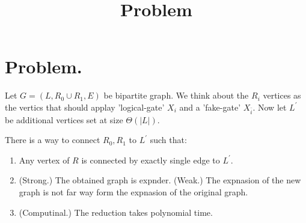 \documentclass[manuscript,screen,review]{acmart}
\begin{document}


\title{Problem} 

\ifdefined\ACM
\else
  \maketitle
\fi
%
\ifdefined\ACM
  \maketitle
\fi


\section{Problem.}

Let $G=(L, R_{0}\cup R_{1}, E)$ be bipartite graph. We think about the $R_{i}$ vertices as the vertics that should applay 'logical-gate' $X_{i}$ and a 'fake-gate' $X_{\bar{i}}$. Now let $L^{\prime}$ be additional vertices set at size $\Theta\left( |L| \right)$. 

\begin{claim}
  There is a way to connect $R_{0},R_{1}$ to $L^{\prime}$ such that: 
  \begin{enumerate}
    \item Any vertex of $R$ is connected by exactly single edge to $L^{\prime}$. 
    \item (Strong.) The obtained graph is expnder. (Weak.) The expnasion of the new graph is not far way form the expnasion of the original graph.
    \item (Computinal.) The reduction takes polynomial time.   
  \end{enumerate}
\end{claim}


\printbibliography
\end{document}
